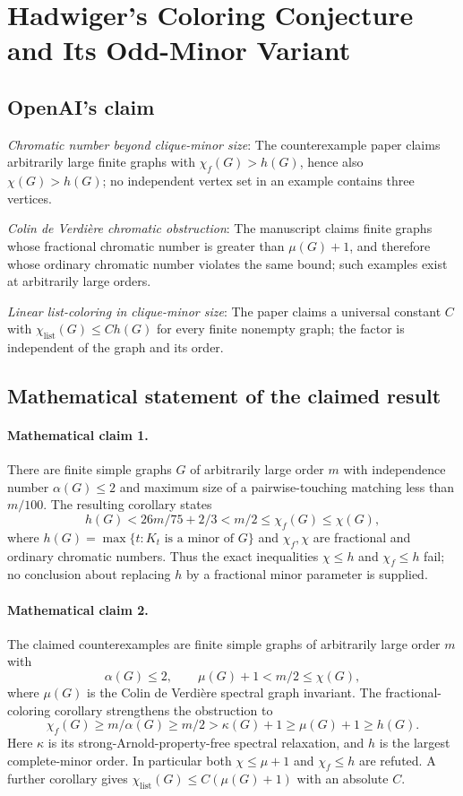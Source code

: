 \documentclass[11pt]{article}
\begin{document}
\section*{Hadwiger’s Coloring Conjecture and Its Odd-Minor Variant}

\subsection{OpenAI's claim}
\textit{Chromatic number beyond clique-minor size}: The counterexample paper claims arbitrarily large finite graphs with $\chi_f(G)>h(G)$, hence also $\chi(G)>h(G)$; no independent vertex set in an example contains three vertices.

\textit{Colin de Verdière chromatic obstruction}: The manuscript claims finite graphs whose fractional chromatic number is greater than $\mu(G)+1$, and therefore whose ordinary chromatic number violates the same bound; such examples exist at arbitrarily large orders.

\textit{Linear list-coloring in clique-minor size}: The paper claims a universal constant $C$ with $\chi_{\mathrm{list}}(G)\le C h(G)$ for every finite nonempty graph; the factor is independent of the graph and its order.

\subsection{Mathematical statement of the claimed result}
\paragraph{Mathematical claim 1.} There are finite simple graphs $G$ of arbitrarily large order $m$ with independence number $\alpha(G)\le2$ and maximum size of a pairwise-touching matching less than $m/100$. The resulting corollary states \[h(G)<26m/75+2/3<m/2\le\chi_f(G)\le\chi(G),\] where $h(G)=\max\{t:K_t\text{ is a minor of }G\}$ and $\chi_f,\chi$ are fractional and ordinary chromatic numbers. Thus the exact inequalities $\chi\le h$ and $\chi_f\le h$ fail; no conclusion about replacing $h$ by a fractional minor parameter is supplied.

\paragraph{Mathematical claim 2.} The claimed counterexamples are finite simple graphs of arbitrarily large order $m$ with \[\alpha(G)\le2,\qquad\mu(G)+1<m/2\le\chi(G),\] where $\mu(G)$ is the Colin de Verdi\`ere spectral graph invariant. The fractional-coloring corollary strengthens the obstruction to \[\chi_f(G)\ge m/\alpha(G)\ge m/2>\kappa(G)+1\ge\mu(G)+1\ge h(G).\] Here $\kappa$ is its strong-Arnold-property-free spectral relaxation, and $h$ is the largest complete-minor order. In particular both $\chi\le\mu+1$ and $\chi_f\le h$ are refuted. A further corollary gives $\chi_{\mathrm{list}}(G)\le C(\mu(G)+1)$ with an absolute $C$.
\end{document}

